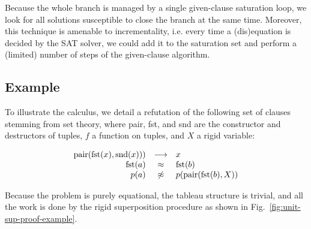 Because the whole branch is managed by a single given-clause saturation loop, we
look for all solutions susceptible to close the branch at the same time.
Moreover, this technique is amenable to incrementality, i.e. every time a
(dis)equation is decided by the SAT solver, we could add it to the saturation
set and perform a (limited) number of steps of the given-clause algorithm.

\subsection{Example}

To illustrate the calculus, we detail a refutation of the following set of
clauses stemming from set theory, where pair, fst, and snd are the constructor
and destructors of tuples, $f$ a function on tuples, and $X$ a rigid variable:

\[\begin{array}{rcl}
\text{pair}(\text{fst}(x), \text{snd}(x))) &\longrightarrow& x\\
\text{fst}(a) &\approx& \text{fst}(b)\\
p(a) &\not\approx& p(\text{pair}(\text{fst}(b), X))\\
\end{array}\]

Because the problem is purely equational, the tableau structure is trivial, and
all the work is done by the rigid superposition procedure as shown in
Fig.~\ref{fig:unit-sup-proof-example}.

